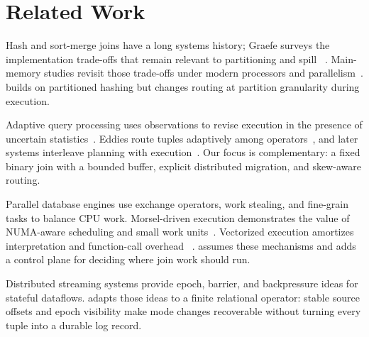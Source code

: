 \section{Related Work}
\label{sec:related}

Hash and sort-merge joins have a long systems history; Graefe surveys the
implementation trade-offs that remain relevant to partitioning and spill
~\cite{graefe1993query}.  Main-memory studies revisit those trade-offs under
modern processors and parallelism~\cite{blanas2011design,balkesen2013main}.
\system{} builds on partitioned hashing but changes routing at partition
granularity during execution.

Adaptive query processing uses observations to revise execution in the
presence of uncertain statistics~\cite{deshpande2007adaptive}.  Eddies route
tuples adaptively among operators~\cite{avni2000eddies}, and later systems
interleave planning with execution~\cite{trummer2019skinner}.  Our focus is
complementary: a fixed binary join with a bounded buffer, explicit distributed
migration, and skew-aware routing.

Parallel database engines use exchange operators, work stealing, and fine-grain
tasks to balance CPU work.  Morsel-driven execution demonstrates the value of
NUMA-aware scheduling and small work units~\cite{leis2014morsel}.  Vectorized
execution amortizes interpretation and function-call overhead
~\cite{boncz2005monetdb}.  \system{} assumes these mechanisms and adds a
control plane for deciding where join work should run.

Distributed streaming systems provide epoch, barrier, and backpressure ideas
for stateful dataflows.  \system{} adapts those ideas to a finite relational
operator: stable source offsets and epoch visibility make mode changes
recoverable without turning every tuple into a durable log record.
